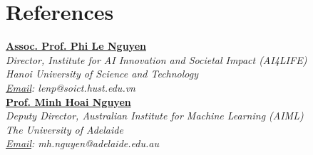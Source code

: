 \documentclass{clean_cv}
\begin{document}
\section{References}
\href{https://soict.hust.edu.vn/ts-nguyen-phi-le.html}{\textbf{Assoc. Prof. Phi Le Nguyen}}
\\ \textit{Director, Institute for AI Innovation and Societal Impact (AI4LIFE)}
\\ \textit{Hanoi University of Science and Technology}
\\ \textit{\underline{Email}: lenp@soict.hust.edu.vn}
\vspace{3mm}
\\
\href{https://minhhoai.net/}{\textbf{Prof. Minh Hoai Nguyen}}
\\ \textit{Deputy Director, Australian Institute for Machine Learning (AIML)}
\\ \textit{The University of Adelaide}
\\ \textit{\underline{Email}: mh.nguyen@adelaide.edu.au}
\end{document}
